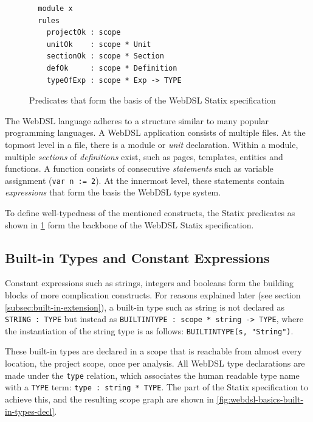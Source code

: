   \begin{figure}
    \vspace{-20pt}
    \capstart
    \begin{verbatim}
  module x
  rules
    projectOk : scope
    unitOk    : scope * Unit
    sectionOk : scope * Section
    defOk     : scope * Definition
    typeOfExp : scope * Exp -> TYPE
    \end{verbatim}
    \caption{\label{fig:webdsl-basic-predicates}Predicates that form the basis of the WebDSL Statix specification}
    \vspace{-10pt}
  \end{figure}

      The WebDSL language adheres to a structure similar to many popular programming languages. A WebDSL application consists of multiple files. At the topmost level in a file, there is a module or \textit{unit} declaration. Within a module, multiple \textit{sections} of \textit{definitions} exist, such as pages, templates, entities and functions. A function consists of consecutive \textit{statements} such as variable assignment (\texttt{var n := 2}). At the innermost level, these statements contain \textit{expressions} that form the basis the WebDSL type system.

      To define well-typedness of the mentioned constructs, the Statix predicates as shown in \cref{fig:webdsl-basic-predicates} form the backbone of the WebDSL Statix specification.

    \subsection{\label{subsec:built-in-types-and-constants}Built-in Types and Constant Expressions}

      Constant expressions such as strings, integers and booleans form the building blocks of more complication constructs. For reasons explained later (see section \cref{subsec:built-in-extension}), a built-in type such as string is not declared as \texttt{STRING : TYPE} but instead as \texttt{BUILTINTYPE : scope * string -> TYPE}, where the instantiation of the string type is as follows: \texttt{BUILTINTYPE(s, "String")}.

      These built-in types are declared in a scope that is reachable from almost every location, the project scope, once per analysis. All WebDSL type declarations are made under the \texttt{type} relation, which associates the human readable type name with a \texttt{TYPE} term: \texttt{type : string * TYPE}. The part of the Statix specification to achieve this, and the resulting scope graph are shown in \cref{fig:webdsl-basics-built-in-types-decl}.

